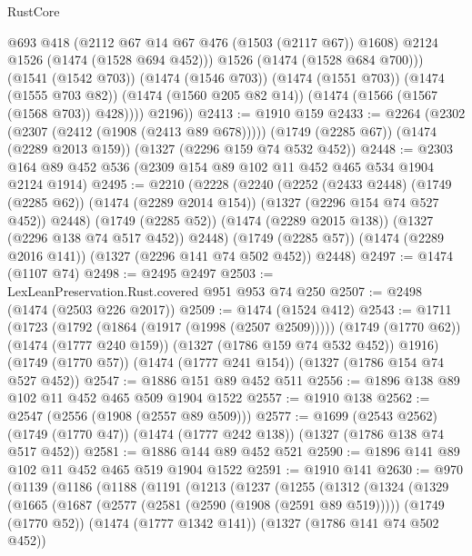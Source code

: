 \begin{lexlean}{RustCore}
\begin{coremodule}
                @693
                @418
                (@2112 @67 @14 @67 @476 (@1503 (@2117 @67)) @1608)
                @2124
                @1526
                (@1474 (@1528 @694 @452)))
              @1526
              (@1474 (@1528 @684 @700)))
            (@1541 (@1542 @703))
            (@1474 (@1546 @703))
            (@1474 (@1551 @703))
            (@1474 (@1555 @703 @82))
            (@1474 (@1560 @205 @82 @14))
            (@1474 (@1566 (@1567 (@1568 @703)) @428))))
        @2196))
@2413 := @1910 @159
@2433 := @2264
    (@2302 (@2307 (@2412 (@1908 (@2413 @89 @678)))))
    (@1749 (@2285 @67))
    (@1474 (@2289 @2013 @159))
    (@1327 (@2296 @159 @74 @532 @452))
@2448 := @2303 @164 @89 @452 @536 (@2309 @154 @89 @102 @11 @452 @465 @534 @1904 @2124 @1914)
@2495 := @2210
    (@2228
      (@2240
        (@2252
          (@2433 @2448)
          (@1749 (@2285 @62))
          (@1474 (@2289 @2014 @154))
          (@1327 (@2296 @154 @74 @527 @452))
          @2448)
        (@1749 (@2285 @52))
        (@1474 (@2289 @2015 @138))
        (@1327 (@2296 @138 @74 @517 @452))
        @2448)
      (@1749 (@2285 @57))
      (@1474 (@2289 @2016 @141))
      (@1327 (@2296 @141 @74 @502 @452))
      @2448)
@2497 := @1474 (@1107 @74)
@2498 := @2495 @2497
@2503 := LexLeanPreservation.Rust.covered @951 @953 @74 @250
@2507 := @2498 (@1474 (@2503 @226 @2017))
@2509 := @1474 (@1524 @412)
@2543 := @1711
    (@1723
      (@1792 (@1864 (@1917 (@1998 (@2507 @2509)))))
      (@1749 (@1770 @62))
      (@1474 (@1777 @240 @159))
      (@1327 (@1786 @159 @74 @532 @452))
      @1916)
    (@1749 (@1770 @57))
    (@1474 (@1777 @241 @154))
    (@1327 (@1786 @154 @74 @527 @452))
@2547 := @1886 @151 @89 @452 @511
@2556 := @1896 @138 @89 @102 @11 @452 @465 @509 @1904 @1522
@2557 := @1910 @138
@2562 := @2547 (@2556 (@1908 (@2557 @89 @509)))
@2577 := @1699
    (@2543 @2562)
    (@1749 (@1770 @47))
    (@1474 (@1777 @242 @138))
    (@1327 (@1786 @138 @74 @517 @452))
@2581 := @1886 @144 @89 @452 @521
@2590 := @1896 @141 @89 @102 @11 @452 @465 @519 @1904 @1522
@2591 := @1910 @141
@2630 := @970
    (@1139
      (@1186
        (@1188
          (@1191
            (@1213
              (@1237
                (@1255
                  (@1312
                    (@1324
                      (@1329
                        (@1665
                          (@1687
                            (@2577 (@2581 (@2590 (@1908 (@2591 @89 @519)))))
                            (@1749 (@1770 @52))
                            (@1474 (@1777 @1342 @141))
                            (@1327 (@1786 @141 @74 @502 @452))

\end{coremodule}
\end{lexlean}

